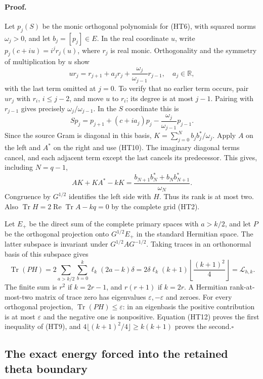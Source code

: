\paragraph{Proof.}
Let $p_j(S)$ be the monic orthogonal polynomials for (HT6), with squared
norms $\omega_j>0$, and let $b_j=[p_j]\in E$.  In the real coordinate $u$,
write $p_j(c+iu)=i^j r_j(u)$, where $r_j$ is real monic.  Orthogonality
and the symmetry of multiplication by $u$ show
\[
 ur_j=r_{j+1}+a_jr_j+\frac{\omega_j}{\omega_{j-1}}r_{j-1},
 \quad a_j\in\mathbb R,
\]
with the last term omitted at $j=0$.  To verify that no earlier term
occurs, pair $ur_j$ with $r_i$, $i\leq j-2$, and move $u$ to $r_i$;
its degree is at most $j-1$.  Pairing with $r_{j-1}$ gives precisely
$\omega_j/\omega_{j-1}$.  In the $S$ coordinate this is
\[
 Sp_j=p_{j+1}+(c+ia_j)p_j
 -\frac{\omega_j}{\omega_{j-1}}p_{j-1}.
 \tag{HT10}
\]
Since the source Gram is diagonal in this basis,
$K=\sum_{j=0}^N b_jb_j^*/\omega_j$.  Apply $A$ on the left and $A^*$
on the right and use (HT10).  The imaginary diagonal terms cancel,
and each adjacent term except the last cancels its predecessor.  This
gives, including $N=q-1$,
\[
 AK+KA^*-kK=
 \frac{b_{N+1}b_N^*+b_Nb_{N+1}^*}{\omega_N}.
 \tag{HT11}
\]
Congruence by $G^{1/2}$ identifies the left side with $H$.  Thus its
rank is at most two.  Also
$\operatorname{Tr}H=2\operatorname{Re}\operatorname{Tr}A-kq=0$
by the complete grid (HT2).

Let $E_+$ be the direct sum of the complete primary spaces with $a>k/2$,
and let $P$ be the orthogonal projection onto $G^{1/2}E_+$ in the standard
Hermitian space.  The latter subspace is invariant under
$G^{1/2}AG^{-1/2}$.  Taking traces in an orthonormal basis of this
subspace gives
\[
 \operatorname{Tr}(PH)
 =2\sum_{a>k/2}\sum_{b=0}^{k}\ell_k(2a-k)\delta
 =2\delta\ell_k(k+1)
 \left\lfloor\frac{(k+1)^2}{4}\right\rfloor
 =\mathcal L_{h,k}.
 \tag{HT12}
\]
The finite sum is $r^2$ if $k=2r-1$, and $r(r+1)$ if $k=2r$.
A Hermitian rank-at-most-two matrix of trace zero has eigenvalues
$\varepsilon,-\varepsilon$ and zeroes.  For every orthogonal projection,
$\operatorname{Tr}(PH)\leq\varepsilon$: in an eigenbasis the positive
contribution is at most $\varepsilon$ and the negative one is nonpositive.
Equation (HT12) proves the first inequality of (HT9), and
$4\lfloor(k+1)^2/4\rfloor\geq k(k+1)$ proves the second.\hfill$\square$

\subsection{The exact energy forced into the retained theta boundary}

